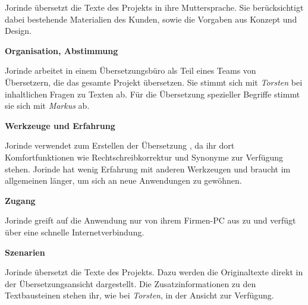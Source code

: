 \begin{multicols}{2}

\begin{center}
\end{center}


Jorinde übersetzt die Texte des Projekts in ihre Muttersprache. Sie berücksichtigt dabei bestehende Materialien des Kunden, sowie die Vorgaben aus Konzept und Design.

\textbf{Organisation, Abstimmung}

Jorinde arbeitet in einem Übersetzungsbüro als Teil eines Teams von Übersetzern, die das gesamte Projekt übersetzen. Sie stimmt sich mit \emph{Torsten} bei inhaltlichen Fragen zu Texten ab. Für die Übersetzung spezieller Begriffe stimmt sie sich mit \emph{Markus} ab.

\textbf{Werkzeuge und Erfahrung}

Jorinde verwendet zum Erstellen der Übersetzung , da ihr dort Komfortfunktionen wie Rechtschreibkorrektur und Synonyme zur Verfügung stehen.  Jorinde hat wenig Erfahrung mit anderen Werkzeugen und braucht im allgemeinen länger, um sich an neue Anwendungen zu gewöhnen.

\textbf{Zugang}

Jorinde greift auf die Anwendung nur von ihrem Firmen-PC aus zu und verfügt über eine schnelle Internetverbindung.

\columnbreak

\textbf{Szenarien}

Jorinde übersetzt die Texte des Projekts. Dazu werden die Originaltexte direkt in der Übersetzungsansicht dargestellt. Die Zusatzinformationen zu den Textbausteinen stehen ihr, wie bei \emph{Torsten}, in der Ansicht zur Verfügung.


\end{multicols}
